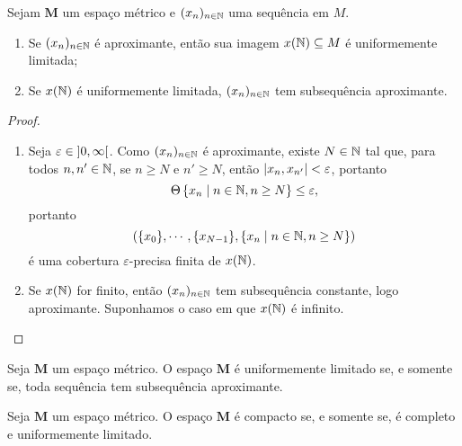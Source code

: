 \begin{lemma}
Sejam $\bm M$ um espaço métrico e $(x_n)_{n \in \mathbb{N}}$ uma sequência em $M$.
	\begin{enumerate}
	\item Se $(x_n)_{n \in \mathbb{N}}$ é aproximante, então sua imagem $x(\mathbb{N}) \subseteq M$ é uniformemente limitada;
	\item Se $x(\mathbb{N})$ é uniformemente limitada, $(x_n)_{n \in \mathbb{N}}$ tem subsequência aproximante.
	\end{enumerate}
\end{lemma}
\begin{proof}
	\begin{enumerate}
	\item Seja $\varepsilon \in \left]0,\allowbreak \infty\right[$. Como $(x_n)_{n \in \mathbb{N}}$ é aproximante, existe $N \in \mathbb{N}$ tal que, para todos $n,n' \in \mathbb{N}$, se $n \geq N$ e $n' \geq N$, então $\left\vert{x_n},{x_{n'}}\right\vert < \varepsilon$, portanto
		\begin{equation*}
		\Theta \left\{ x_n \;\middle\vert\; n \in \mathbb{N}, n \geq N \right\} \leq \varepsilon,
		\end{equation*}
portanto
		\begin{equation*}
		(\{x_0\},\cdots,\{x_{N-1}\}, \left\{ x_n \;\middle\vert\; n \in \mathbb{N}, n \geq N \right\})
		\end{equation*}
é uma cobertura $\varepsilon$-precisa finita de $x(\mathbb{N})$.

	\item Se $x(\mathbb{N})$ for finito, então $(x_n)_{n \in \mathbb{N}}$ tem subsequência constante, logo aproximante. Suponhamos o caso em que $x(\mathbb{N})$ é infinito.

	\end{enumerate}
\end{proof}


\begin{proposition}
Seja $\bm M$ um espaço métrico. O espaço $\bm M$ é uniformemente limitado se, e somente se, toda sequência tem subsequência aproximante.
\end{proposition}

\begin{proposition}
Seja $\bm M$ um espaço métrico. O espaço $\bm M$ é compacto se, e somente se, é completo e uniformemente limitado.
\end{proposition}






